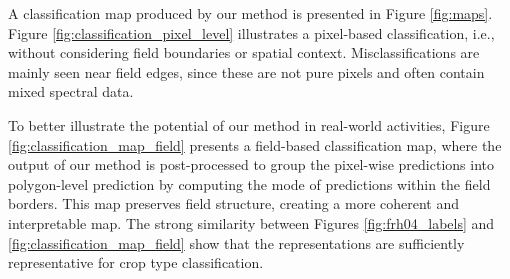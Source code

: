\documentclass[journal,article,submit,pdftex,moreauthors]{Definitions/mdpi}
\begin{document}


A classification map produced by our method is presented in Figure \ref{fig:maps}. 
Figure \ref{fig:classification_pixel_level} illustrates a pixel-based classification, i.e., without considering field boundaries or spatial context. Misclassifications are mainly seen  near field edges, since these are not pure pixels and often contain mixed spectral data. 

To better illustrate the potential of our method in real-world activities, Figure \ref{fig:classification_map_field} presents a field-based classification map, where the output of our method is post-processed to group the pixel-wise predictions into polygon-level prediction by computing the mode of predictions within the field borders. This map preserves field structure, creating a more coherent and interpretable map. The strong similarity between Figures \ref{fig:frh04_labels} and \ref{fig:classification_map_field} show that the representations are sufficiently representative for crop type classification.
\end{document}

